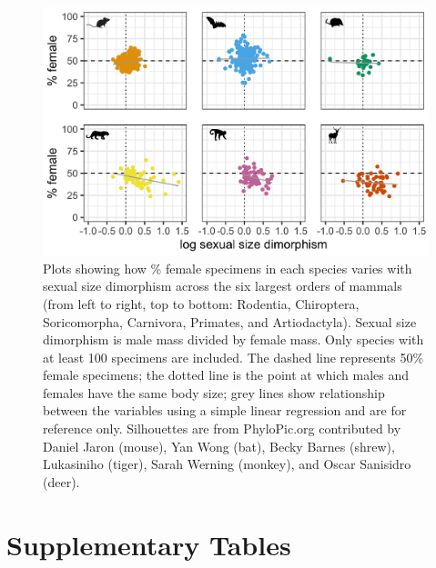 \documentclass[a4paper, 12pt]{article}
\begin{document}
\begin{figure}
 \centering
  \includegraphics[width = \linewidth]{figures/ssd-orders-mammals.png}
  \caption{Plots showing how \% female specimens in each species varies with sexual size dimorphism across the six largest orders of mammals (from left to right, top to bottom: Rodentia, Chiroptera, Soricomorpha, Carnivora, Primates, and Artiodactyla). 
  Sexual size dimorphism is male mass divided by female mass. 
  Only species with at least 100 specimens are included. 
  The dashed line represents 50\% female specimens; the dotted line is the point at which males and females have the same body size; grey lines show relationship between the variables using a simple linear regression and are for reference only. 
  Silhouettes are from PhyloPic.org contributed by Daniel Jaron (mouse), Yan Wong (bat), Becky Barnes (shrew), Lukasiniho (tiger), Sarah Werning (monkey), and Oscar Sanisidro (deer).}
  \label{fig-mammal-ssd}
\end{figure}



\newpage
\section{Supplementary Tables}



\newpage


\newpage

\end{document}
